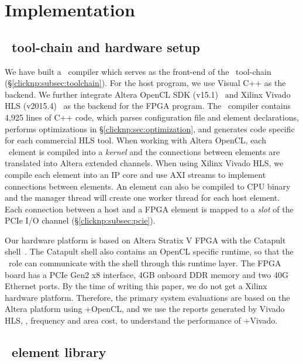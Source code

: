 \section{Implementation}
\label{clicknp:sec:impl}

\subsection{\name\ tool-chain and hardware setup}
We have built a \name\ compiler which serves as the front-end of the \name\ tool-chain (\S\ref{clicknp:subsec:toolchain}).  
%
For the host program, we use Visual C++ as the backend. We further integrate Altera OpenCL SDK (v15.1)~\cite{aoc} and 
Xilinx Vivado HLS (v2015.4)~\cite{vivado} as the backend for the FPGA program.
%
The \name\ compiler contains 4,925 lines of C++ code, which parses configuration file and element declarations, 
performs optimizations in \S\ref{clicknp:sec:optimization}, and generates code specific for each commercial HLS tool.
When working with Altera OpenCL, each \name\ element is compiled into a \textit{kernel} and 
the connections between elements are translated into Altera extended channels.
When using Xilinx Vivado HLS, we compile each element into an IP core and 
use AXI streams to implement connections between elements.
%
An element can also be compiled to CPU binary and the manager thread will create one worker thread for each host element.
%
Each connection between a host and a FPGA element is mapped to a \textit{slot} of the PCIe I/O 
channel (\S\ref{clicknp:subsec:pcie}).

Our hardware platform is based on Altera Stratix V FPGA with the Catapult shell~\cite{putnam2014reconfigurable}.
The Catapult shell also contains an OpenCL specific runtime, so that the \name\ role can communicate with the shell 
through this runtime layer.
The FPGA board has a PCIe Gen2 x8 interface, 4GB onboard DDR memory and two 40G Ethernet ports. 
%
By the time of writing this paper, we do not get a Xilinx hardware platform. 
Therefore, the primary system evaluations are based on the Altera platform using \name+OpenCL, 
and we use the reports generated by Vivado HLS, \eg, frequency and area cost, to understand 
the performance of \name+Vivado.

\subsection{\name\ element library}
\label{clicknp:subsec:lib}

